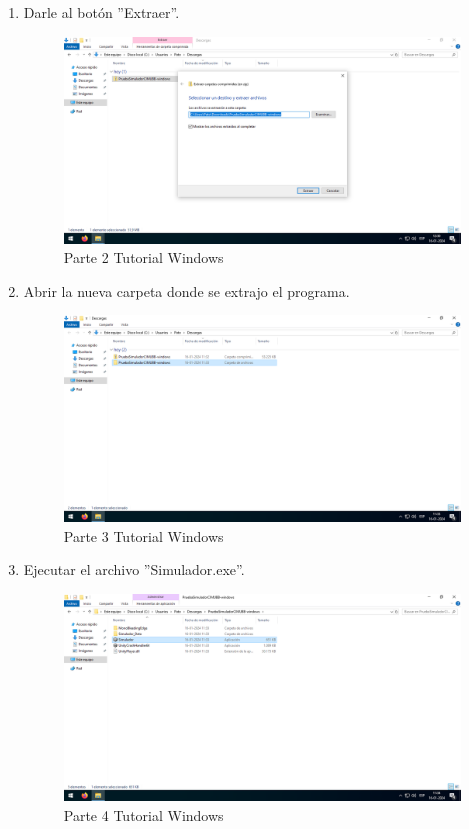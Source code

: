 \begin{enumerate}[label=\arabic*.-]
    \item Darle al botón ''Extraer''.
\begin{figure}[ht]
    \centering
    \includegraphics[width=10.5cm]{figures/TutorialWindows/tutorial (7).png}
    \caption{Parte 2 Tutorial Windows}
    \label{fig:tutowin2}
\end{figure}

    \item Abrir la nueva carpeta donde se extrajo el programa.
\begin{figure}[ht]
    \centering
    \includegraphics[width=10.5cm]{figures/TutorialWindows/tutorial (8).png}
    \caption{Parte 3 Tutorial Windows}
    \label{fig:tutowin3}
\end{figure}
\clearpage

    \item Ejecutar el archivo ''Simulador.exe''.
\begin{figure}[ht]
    \centering
    \includegraphics[width=10.5cm]{figures/TutorialWindows/tutorial (9).png}
    \caption{Parte 4 Tutorial Windows}
    \label{fig:tutowin4}
\end{figure}


\end{enumerate}
